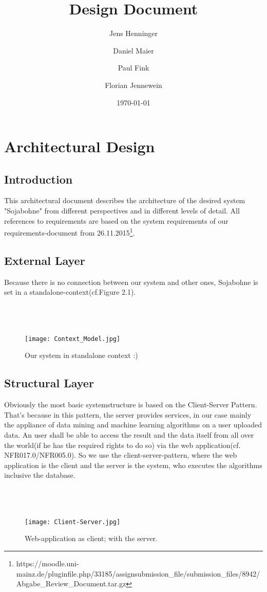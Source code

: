 \documentclass{book}
\title{Design Document}
\author{Jens Henninger \and Daniel Maier \and Paul Fink \and Florian Jennewein}
\date{\today}
\begin{document}
\frontmatter
\maketitle
\tableofcontents
\mainmatter
\part{Architectural Design}

\chapter{Introduction}
This architectural document describes the architecture of the desired system "Sojabohne" from different perspectives and in different levels of detail. All references to requirements are based on the system requirements of our requirements-document from 26.11.2015\footnote{https://moodle.uni-mainz.de/pluginfile.php/33185/assignsubmission\_file/submission\_files/8942/Abgabe\_Review\_Document.tar.gz}.
\chapter{External Layer}
Because there is no connection between our system and other ones, Sojabohne is set in a standalone-context(cf.Figure 2.1). \\\\\\\\
\begin{figure}[h]
\centering
\texttt{[image: Context\_Model.jpg]}
\caption{Our system in standalone context :)}
\label{Fig. 1}
\end{figure}
\chapter{Structural Layer}
Obviously the most basic systemstructure is based on the Client-Server Pattern. That's because in this pattern, the server provides services, in our case mainly the appliance of data mining and machine learning algorithms on a user uploaded data. An user shall be able to access the result and the data itself from all over the world(if he has the required rights to do so) via the web application(cf. NFR017.0/NFR005.0). So we use the client-server-pattern, where the web application is the client and the server is the system, who executes the algorithms inclusive the database.\\\\\\\\
\begin{figure}[h]
\centering
\texttt{[image: Client-Server.jpg]}
\caption{Web-application as client; with the server.}
\label{Fig. 2}
\end{figure} 
\end{document}
